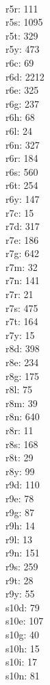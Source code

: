 \begin{multicols}{8}
  \\r5r: 111
  \\r5s: 1095
  \\r5t: 329
  \\r5y: 473
  \\r6c: 69
  \\r6d: 2212
  \\r6e: 325
  \\r6g: 237
  \\r6h: 68
  \\r6l: 24
  \\r6n: 327
  \\r6r: 184
  \\r6s: 560
  \\r6t: 254
  \\r6y: 147
  \\r7c: 15
  \\r7d: 317
  \\r7e: 186
  \\r7g: 642
  \\r7m: 32
  \\r7n: 141
  \\r7r: 21
  \\r7s: 475
  \\r7t: 164
  \\r7y: 15
  \\r8d: 398
  \\r8e: 234
  \\r8g: 175
  \\r8l: 75
  \\r8m: 39
  \\r8n: 640
  \\r8r: 11
  \\r8s: 168
  \\r8t: 29
  \\r8y: 99
  \\r9d: 110
  \\r9e: 78
  \\r9g: 87
  \\r9h: 14
  \\r9l: 13
  \\r9n: 151
  \\r9s: 259
  \\r9t: 28
  \\r9y: 55
  \\s10d: 79
  \\s10e: 107
  \\s10g: 40
  \\s10h: 15
  \\s10i: 17
  \\s10n: 81

\end{multicols}
